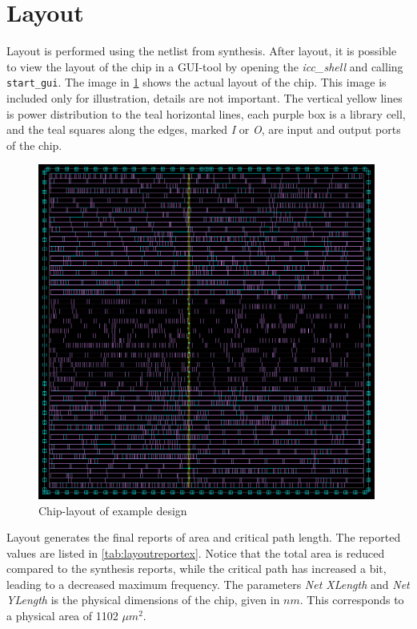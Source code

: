\section{Layout}
Layout is performed using the netlist from synthesis. After layout, it is possible to view the layout of the chip in a GUI-tool by opening the \textit{icc\_shell} and calling \verb!start_gui!. The image in \cref{fig:layoutcircuit} shows the actual layout of the chip. This image is included only for illustration, details are not important. The vertical yellow lines is power distribution to the teal horizontal lines, each purple box is a library cell, and the teal squares along the edges, marked \textit{I} or \textit{O}, are input and output ports of the chip. 
\begin{figure}[hbpt]
\centering
\includegraphics[width=0.99\textwidth]{../figs/LayoutCircuit.png}
\caption{\label{fig:layoutcircuit}Chip-layout of example design}
\end{figure}
Layout generates the final reports of area and critical path length. The reported values are listed in \cref{tab:layoutreportex}. Notice that the total area is reduced compared to the synthesis reports, while the critical path has increased a bit, leading to a decreased maximum frequency. The parameters \textit{Net XLength} and \textit{Net YLength} is the physical dimensions of the chip, given in $nm$. This corresponds to a physical area of 1102 $\mu m^2$.

